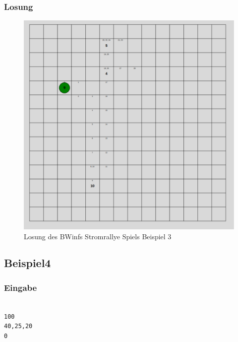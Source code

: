\documentclass[a4paper,12pt,arial]{scrartcl}
\begin{document}
\subsubsection{Losung}
\begin{figure}[h]
    \centering
    \includegraphics[width=\textwidth]{solution3.pdf}
    \caption{Losung des BWinfs Stromrallye Spiels Beispiel 3}
    \label{fig:loesung3}
\end{figure}

\subsection{Beispiel4}
\subsubsection{Eingabe}
\texttt{ \\
100 \\
40,25,20 \\
0 \\
}
\end{document}
